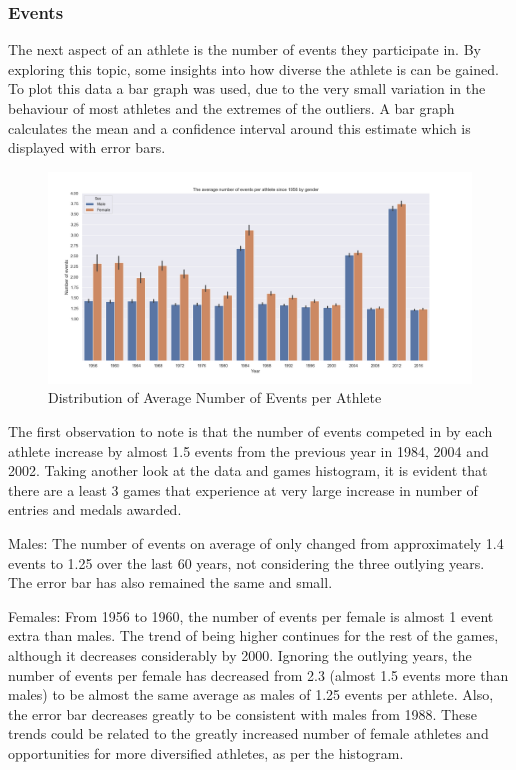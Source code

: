 \documentclass[a4 paper, 12pt]{article}
\begin{document}
        \subsubsection{Events}
        The next aspect of an athlete is the number of events they participate in. By exploring this topic, some insights into how diverse the athlete is can be gained. To plot this data a bar graph was used, due to the very small variation in the behaviour of most athletes and the extremes of the outliers. A bar graph calculates the mean and a confidence interval around this estimate which is displayed with error bars. 
        \begin{figure} [H]
            \centering
            \includegraphics[width=\textwidth, frame]
                {./images/graph/athlete_event_barplot.png}      
                \caption{Distribution of Average Number of Events per Athlete} 
        \end{figure}
        The first observation to note is that the number of events competed in by each athlete increase by almost 1.5 events from the previous year in 1984, 2004 and 2002.  Taking another look at the data and games histogram, it is evident that there are a least 3 games that experience at very large increase in number of entries and medals awarded. 

        Males: The number of events on average of only changed from approximately 1.4 events to 1.25 over the last 60 years, not considering the three outlying years. The error bar has also remained the same and small. 

        Females: From 1956 to 1960, the number of events per female is almost 1 event extra than males. The trend of being higher continues for the rest of the games, although it decreases considerably by 2000. Ignoring the outlying years, the number of events per female has decreased from 2.3 (almost 1.5 events more than males) to be almost the same average as males of 1.25 events per athlete. Also, the error bar decreases greatly to be consistent with males from 1988. These trends could be related to the greatly increased number of female athletes and opportunities for more diversified athletes, as per the histogram.         
\end{document}
